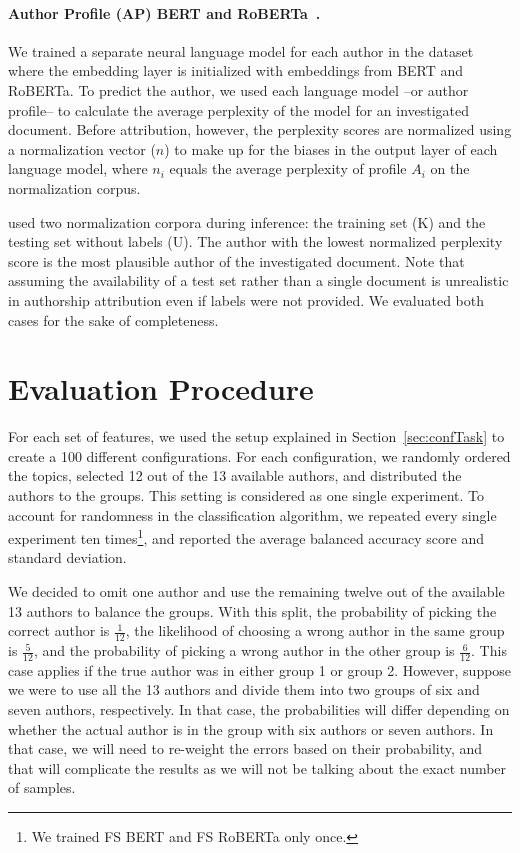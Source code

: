 \documentclass[11pt]{article}
\begin{document}
\paragraph{Author Profile (AP) BERT and RoBERTa~\citep{Barlas2020,Barlas2021}.} 
We trained a separate neural language model for each author in the dataset where the embedding layer is initialized with embeddings from BERT and RoBERTa. To predict the author, we used each language model --or author profile-- to calculate the average perplexity of the model for an investigated document. Before attribution, however, the perplexity scores are normalized using a normalization vector ($n$) to make up for the biases in the output layer of each language model, where $n_i$ equals the average perplexity of profile $A_i$ on the normalization corpus.

\citet{Barlas2020,Barlas2021} used two normalization corpora during inference: the training set (K) and the testing set without labels (U). The author with the lowest normalized perplexity score is the most plausible author of the investigated document. Note that assuming the availability of a test set rather than a single document is unrealistic in authorship attribution even if labels were not provided. We evaluated both cases for the sake of completeness.  

\section{\label{subsec:eval}Evaluation Procedure}
For each set of features, we used the setup explained in Section~\ref{sec:confTask} to create a 100 different configurations. For each configuration, we randomly ordered the topics, selected 12 out of the 13 available authors, and distributed the authors to the groups. This setting is considered as one single experiment. To account for randomness in the classification algorithm, we repeated every single experiment ten times\footnote{We trained FS BERT and FS RoBERTa only once.}, and reported the average balanced accuracy score and standard deviation.

We decided to omit one author and use the remaining twelve out of the available 13 authors to balance the groups. With this split, the probability of picking the correct author is $\frac{1}{12}$, the likelihood of choosing a wrong author in the same group is $\frac{5}{12}$, and the probability of picking a wrong author in the other group is $\frac{6}{12}$. This case applies if the true author was in either group 1 or group 2. However, suppose we were to use all the 13 authors and divide them into two groups of six and seven authors, respectively. In that case, the probabilities will differ depending on whether the actual author is in the group with six authors or seven authors. In that case, we will need to re-weight the errors based on their probability, and that will complicate the results as we will not be talking about the exact number of samples.  
\end{document}
